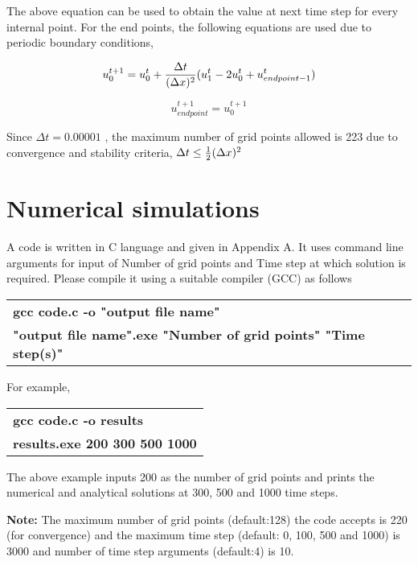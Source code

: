 \documentclass[12pt]{article}
\begin{document}
	The above equation can be used to obtain the value at next time step for every internal point. For the end points, the following equations are used due to periodic boundary conditions,
	
	\begin{equation}
	u^{t+1}_{0}= u^t_0 + {\Delta t \over (\Delta x)^2} (u^t_{1}-2u^t_0+u^t_{endpoint-1})
	\end{equation} 
	
	\begin{equation}
	u^{t+1}_{endpoint}= u^{t+1}_0
	\end{equation}
	
	Since $\Delta t = 0.00001$ , the maximum number of grid points allowed is 223 due to convergence and stability criteria, $\Delta t \leq {1\over2}(\Delta x)^2$

	\section{Numerical simulations}
	
	A code is written in C language and given in Appendix A. It uses command line arguments for input of Number of grid points and Time step at which solution is required. Please compile it using a suitable compiler (GCC) as follows	
	\begin{center}
		\begin{tabular}{l}
			\textbf{gcc code.c -o "output file name"} \\
			\textbf{"output file name".exe "Number of grid points" "Time step(s)"}
		\end{tabular}
	\end{center}
	
	For example,
	
	\begin{center}
		\begin{tabular}{l}
			\textbf{gcc code.c -o results} \\
			\textbf{results.exe 200 300 500 1000}
		\end{tabular}
	\end{center}

	The above example inputs 200 as the number of grid points and prints the numerical and analytical solutions at 300, 500 and 1000 time steps. 

	\textbf{Note:} The maximum number of grid points (default:128) the code accepts is 220 (for convergence) and the maximum time step (default: 0, 100, 500 and 1000) is 3000 and number of time step arguments (default:4) is 10.
\end{document}
